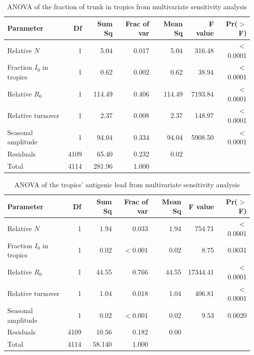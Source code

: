 \documentclass[10pt]{article}
\begin{document}
\begin{table}[h!]
\caption{ANOVA of the fraction of trunk in tropics from multivariate sensitivity analysis}
\label{tab:LHS_ANOVA_trunk}
\begin{tabular}{@{\vrule height 10.5pt depth4pt  width0pt}lrrrrrr}
  \hline
 Parameter & Df & Sum Sq & Frac of var & Mean Sq & F value & Pr($>$F) \\ 
  \hline
  Relative $N$         & 1 & 5.04 & 0.017 & 5.04 & 316.48 & $<$0.0001 \\ 
  Fraction $I_0$ in tropics  & 1 & 0.62 & 0.002 & 0.62 & 38.94 & $<$0.0001 \\ 
  Relative $R_0$        & 1 & 114.49 & 0.406& 114.49 & 7193.84 & $<$0.0001 \\ 
  Relative turnover  & 1 & 2.37 & 0.008 & 2.37 & 148.97 & $<$0.0001 \\ 
  Seasonal amplitude & 1 & 94.04 & 0.334 & 94.04 & 5908.50 & $<$0.0001 \\ 
  Residuals         & 4109 & 65.40& 0.232 & 0.02 &  &  \\ 
   Total         & 4114 & 281.96 & 1.000 & &  &  \\ 
   \hline
\end{tabular}
\end{table}

\begin{table}[h!]
\caption{ANOVA of the tropics' antigenic lead from multivariate sensitivity analysis}
\label{tab:LHS_ANOVA_agLead}
\begin{tabular}{@{\vrule height 10.5pt depth4pt width0pt}lrrrrrr}
\hline
 Parameter & Df & Sum Sq & Frac of var &Mean Sq & F value & Pr($>$F) \\ 
  \hline
  Relative $N$     & 1 & 1.94 & 0.033 & 1.94 & 754.71 & $<$0.0001 \\ 
  Fraction $I_0$ in tropics & 1 & 0.02 & $<$0.001 &0.02 & 8.75 & 0.0031 \\ 
  Relative $R_0$    & 1 & 44.55 & 0.766 & 44.55 & 17344.41 & $<$0.0001 \\ 
  Relative turnover & 1 & 1.04 & 0.018 & 1.04 & 406.81 & $<$0.0001 \\ 
  Seasonal amplitude & 1 & 0.02 & $<$0.001& 0.02 & 9.53 & 0.0020 \\ 
  Residuals & 4109 & 10.56 & 0.182& 0.00 &  &  \\ 
  Total         & 4114 & 58.140 & 1.000 & & &\\ 
   \hline
\end{tabular}
\end{table}
\end{document}
